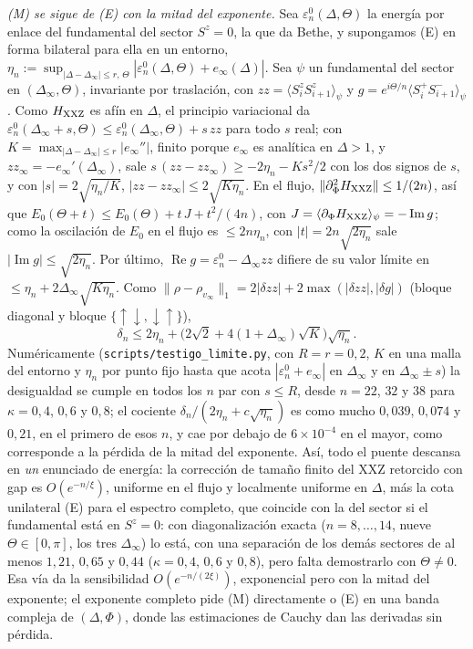 \documentclass[11pt,a4paper]{article}
\theoremstyle{remark}
\newcommand{\ev}[1]{\langle #1\rangle}
\begin{document}
\begin{enumerate}
  \emph{(M) se sigue de (E) con la mitad del exponente.} Sea $\varepsilon^0_n(\Delta,\Theta)$ la
  energía por enlace del fundamental del sector $S^z=0$, la que da Bethe, y supongamos (E) en forma
  bilateral para ella en un entorno, $\eta_n:=\sup_{|\Delta-\Delta_\infty|\le r,\,\Theta}
  |\varepsilon^0_n(\Delta,\Theta)+e_\infty(\Delta)|$. Sea $\psi$ un fundamental del sector en
  $(\Delta_\infty,\Theta)$, invariante por traslación, con $zz=\ev{S^z_iS^z_{i+1}}_\psi$ y
  $g=e^{i\Theta/n}\ev{S^+_iS^-_{i+1}}_\psi$. Como $H_{\rm XXZ}$ es afín en $\Delta$, el principio
  variacional da $\varepsilon^0_n(\Delta_\infty+s,\Theta)\le\varepsilon^0_n(\Delta_\infty,\Theta)+s\,zz$ para
  todo $s$ real; con $K=\max_{|\Delta-\Delta_\infty|\le r}|e_\infty''|$, finito porque $e_\infty$ es
  analítica en $\Delta>1$, y $zz_\infty=-e_\infty'(\Delta_\infty)$, sale
  $s\,(zz-zz_\infty)\ge-2\eta_n-Ks^2/2$ con los dos signos de $s$, y con $|s|=2\sqrt{\eta_n/K}$,
  $|zz-zz_\infty|\le2\sqrt{K\eta_n}$. En el flujo, $\|\partial_\Phi^2H_{\rm XXZ}\|\le1/(2n)$, así que
  $E_0(\Theta+t)\le E_0(\Theta)+t\,J+t^2/(4n)$, con $J=\ev{\partial_\Phi H_{\rm XXZ}}_\psi=-\operatorname{Im}g$;
  como la oscilación de $E_0$ en el flujo es $\le2n\eta_n$, con $|t|=2n\sqrt{2\eta_n}$ sale
  $|\operatorname{Im}g|\le\sqrt{2\eta_n}$. Por último,
  $\operatorname{Re}g=\varepsilon^0_n-\Delta_\infty zz$ difiere de su valor límite en
  $\le\eta_n+2\Delta_\infty\sqrt{K\eta_n}$. Como $\|\rho-\rho_{v_\infty}\|_1=2|\delta zz|+2\max(|\delta zz|,|\delta g|)$
  (bloque diagonal y bloque $\{\uparrow\downarrow,\downarrow\uparrow\}$),
  \[
    \delta_n\le2\eta_n+\big(2\sqrt2+4(1+\Delta_\infty)\sqrt K\big)\sqrt{\eta_n}.
  \]
  Numéricamente (\texttt{scripts/testigo\_limite.py}, con $R=r=0{,}2$, $K$ en una malla del entorno
  y $\eta_n$ por punto fijo hasta que acota $|\varepsilon^0_n+e_\infty|$ en $\Delta_\infty$ y en
  $\Delta_\infty\pm s$) la desigualdad se cumple en todos los $n$ par con $s\le R$, desde $n=22$, $32$
  y $38$ para $\kappa=0{,}4$, $0{,}6$ y $0{,}8$; el cociente $\delta_n/(2\eta_n+c\sqrt{\eta_n})$ es
  como mucho $0{,}039$, $0{,}074$ y $0{,}21$, en el primero de esos $n$, y cae por debajo de
  $6\times10^{-4}$ en el mayor, como corresponde a la pérdida de la mitad del exponente.
  Así, todo el puente descansa en \emph{un} enunciado de energía: la corrección de tamaño finito del
  XXZ retorcido con gap es $O(e^{-n/\xi})$, uniforme en el flujo y localmente uniforme en $\Delta$,
  más la cota unilateral (E) para el espectro completo, que coincide con la del sector si el
  fundamental está en $S^z=0$: con diagonalización exacta ($n=8,\dots,14$, nueve $\Theta\in[0,\pi]$,
  los tres $\Delta_\infty$) lo está, con una separación de los demás sectores de al menos $1{,}21$,
  $0{,}65$ y $0{,}44$ ($\kappa=0{,}4$, $0{,}6$ y $0{,}8$), pero falta demostrarlo con $\Theta\neq0$. Esa vía da la sensibilidad $O(e^{-n/(2\xi)})$, exponencial pero con la mitad del
  exponente; el exponente completo pide (M) directamente o (E) en una banda compleja de
  $(\Delta,\Phi)$, donde las estimaciones de Cauchy dan las derivadas sin pérdida.


\end{enumerate}
\end{document}
